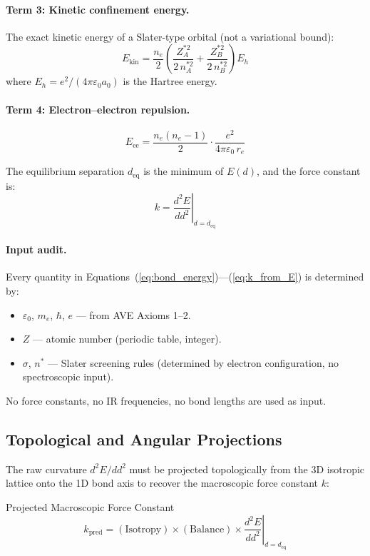 \paragraph{Term 3: Kinetic confinement energy.}
The exact kinetic energy of a Slater-type orbital (not a variational bound):
\begin{equation}
    E_\text{kin} = \frac{n_e}{2} \left( \frac{Z_A^{*2}}{2\,n_A^{*2}} + \frac{Z_B^{*2}}{2\,n_B^{*2}} \right) E_h
\end{equation}
where $E_h = e^2/(4\pi\varepsilon_0 a_0)$ is the Hartree energy.

\paragraph{Term 4: Electron--electron repulsion.}
\begin{equation}
    E_\text{ee} = \frac{n_e(n_e - 1)}{2} \cdot \frac{e^2}{4\pi\varepsilon_0 \, r_e}
\end{equation}

The equilibrium separation $d_\text{eq}$ is the minimum of $E(d)$, and the force constant is:
\begin{equation}
    k = \left. \frac{d^2 E}{d d^2} \right|_{d = d_\text{eq}}
    \label{eq:k_from_E}
\end{equation}

\paragraph{Input audit.} Every quantity in Equations~(\ref{eq:bond_energy})---(\ref{eq:k_from_E}) is determined by:
\begin{itemize}
    \item $\varepsilon_0$, $m_e$, $\hbar$, $e$ --- from AVE Axioms 1--2.
    \item $Z$ --- atomic number (periodic table, integer).
    \item $\sigma$, $n^*$ --- Slater screening rules (determined by electron configuration, no spectroscopic input).
\end{itemize}
No force constants, no IR frequencies, no bond lengths are used as input.

\subsection{Topological and Angular Projections}

The raw curvature $d^2E/dd^2$ must be projected topologically from the 3D isotropic lattice onto the 1D bond axis to recover the macroscopic force constant $k$:
\begin{resultbox}{Projected Macroscopic Force Constant}
\begin{equation}
    k_\text{pred} = (\text{Isotropy}) \times (\text{Balance}) \times \left. \frac{d^2 E}{d d^2} \right|_{d = d_\text{eq}}
    \label{eq:projected_k}
\end{equation}
\end{resultbox}

